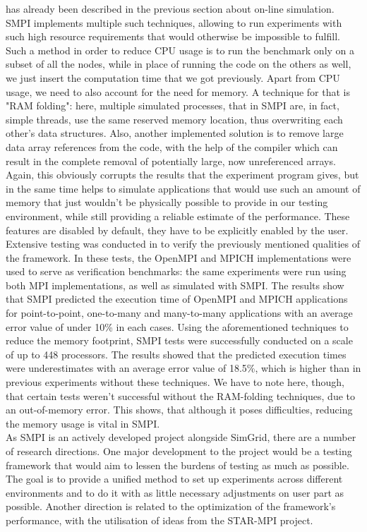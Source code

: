 has already been described in the previous section about on-line
simulation. SMPI implements multiple such techniques, allowing to run
experiments with such high resource requirements that would otherwise
be impossible to fulfill. Such a method in order to reduce CPU usage
is to run the
benchmark only on a subset of all the nodes, while in place of running
the code on the others as well, we just insert the computation time
that we got previously. Apart from CPU usage, we need to also account
for the need for memory. A technique for that is "RAM folding": here,
multiple simulated processes, that in SMPI are, in fact, simple
threads, use the same reserved memory location, thus overwriting each
other's data structures. Also, another implemented solution is to
remove large data array references from the code, with the help of the
compiler which can result in the complete removal of potentially
large, now unreferenced arrays. Again, this obviously corrupts the
results that the experiment program gives, but in the same time helps
to simulate applications that would use such an amount of memory that
just wouldn't be physically possible to provide in our testing
environment, while still providing a reliable estimate of the
performance.\cite{bdglmqssv13} These features are disabled by default,
they have to be explicitly enabled by the user.\\
Extensive testing was conducted in \cite{csgscq11} to verify the
previously mentioned qualities of the framework. In these tests, the
OpenMPI and MPICH implementations were used to serve as verification
benchmarks: the same experiments were run using both MPI
implementations, as well as simulated with SMPI. The
results show that SMPI predicted the execution time of OpenMPI and
MPICH applications for point-to-point, one-to-many and many-to-many
applications with an average error value of under 10\% in each
cases. Using the aforementioned techniques to reduce the memory
footprint, SMPI tests
were successfully conducted on a scale of up to 448 processors. The
results showed that the predicted execution times were
underestimates with an average error value of 18.5\%, which is higher
than in previous experiments without these techniques. We have to note
here, though, that
certain tests weren't successful without the RAM-folding techniques,
due to an out-of-memory error. This shows, that although it poses
difficulties, reducing the memory usage is vital in SMPI.\\
As SMPI is an actively developed project alongside SimGrid, there are
a number of research directions. One major development to the
project would be a testing framework that would aim to lessen the
burdens of testing as much as possible. The goal is to provide a
unified method to set up experiments across different environments and
to do it with as little necessary adjustments on user part as
possible. Another direction is related to the optimization of the
framework's performance, with the utilisation of ideas from the
STAR-MPI project.
